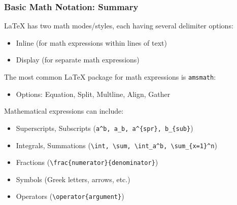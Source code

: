 \begin{frame}[fragile]
\frametitle{Basic Math Notation: Summary}
\LaTeX{} has two math modes/styles, each having several delimiter options: 
\begin{itemize}
    \item Inline (for math expressions within lines of text)
    \item Display (for separate math expressions)
\end{itemize} \pause
The most common \LaTeX{} package for math expressions is \texttt{amsmath}:
\begin{itemize}
    \item Options: Equation, Split, Multline, Align, Gather
\end{itemize} \pause
Mathematical expressions can include:
\begin{itemize}
    \small
    \item Superscripts, Subscripts (\verb|a^b, a_b, a^{spr}, b_{sub}|)
    \item Integrals, Summations (\verb|\int, \sum, \int_a^b, \sum_{x=1}^n|)
    \item Fractions (\verb|\frac{numerator}{denominator}|)
    \item Symbols (Greek letters, arrows, etc.)
    \item Operators (\verb|\operator{argument}|)
\end{itemize}
\end{frame}